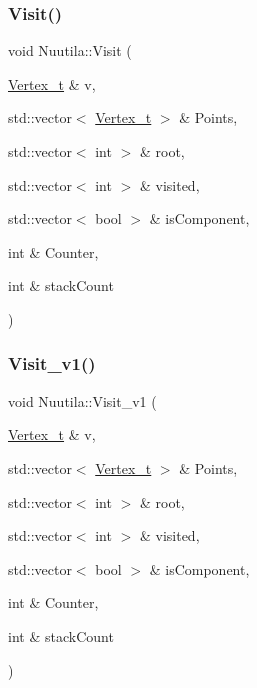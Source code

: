 \subsubsection{\texorpdfstring{Visit()}{Visit()}}
{\footnotesize\ttfamily void Nuutila\+::\+Visit (\begin{DoxyParamCaption}\item[{\hyperlink{class_graph_component_ae67114a6ce5a001dc35e1996e1b45aa0}{Vertex\+\_\+t} \&}]{v,  }\item[{std\+::vector$<$ \hyperlink{class_graph_component_ae67114a6ce5a001dc35e1996e1b45aa0}{Vertex\+\_\+t} $>$ \&}]{Points,  }\item[{std\+::vector$<$ int $>$ \&}]{root,  }\item[{std\+::vector$<$ int $>$ \&}]{visited,  }\item[{std\+::vector$<$ bool $>$ \&}]{is\+Component,  }\item[{int \&}]{Counter,  }\item[{int \&}]{stack\+Count }\end{DoxyParamCaption})}

\mbox{\label{class_nuutila_a83b47177cf452e80b3ceaf064ff59840}} 
\subsubsection{\texorpdfstring{Visit\+\_\+v1()}{Visit\_v1()}}
{\footnotesize\ttfamily void Nuutila\+::\+Visit\+\_\+v1 (\begin{DoxyParamCaption}\item[{\hyperlink{class_graph_component_ae67114a6ce5a001dc35e1996e1b45aa0}{Vertex\+\_\+t} \&}]{v,  }\item[{std\+::vector$<$ \hyperlink{class_graph_component_ae67114a6ce5a001dc35e1996e1b45aa0}{Vertex\+\_\+t} $>$ \&}]{Points,  }\item[{std\+::vector$<$ int $>$ \&}]{root,  }\item[{std\+::vector$<$ int $>$ \&}]{visited,  }\item[{std\+::vector$<$ bool $>$ \&}]{is\+Component,  }\item[{int \&}]{Counter,  }\item[{int \&}]{stack\+Count }\end{DoxyParamCaption})}

\mbox{\label{class_nuutila_afc7a8c27d8de17ac2679f839ff8c2749}} 
